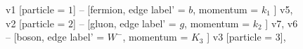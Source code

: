 \documentclass{revtex4}
\begin{document}
\begin{figure}[!htb]
\begin{center}
{    %
v1 [particle = \(1\)] -- [fermion, edge label' = \(b\), momentum = \(k_{1}\) ] v5, 
v2 [particle = \(2\)] -- [gluon, edge label' = \(g\), momentum = \(k_{2}\) ] v7, 
v6 -- [boson, edge label' = \(W^{-}\), momentum = \(K_{3}\) ] v3 [particle = \(3\)], 
}
\end{center}
\end{figure}
\end{document}
